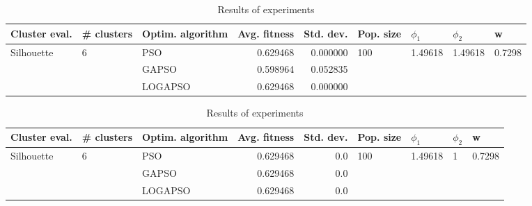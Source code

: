 \documentclass{article}
\begin{document}
\begin{table}
\centering
\caption{Results of experiments}
\begin{tabular}{lllrrllll}
\toprule
              Cluster eval. &        \# clusters & Optim. algorithm &  Avg. fitness &  Std. dev. &            Pop. size &               $\phi_{1}$ &               $\phi_{2}$ &                       w \\
\midrule
\multirow{3}{*}{Silhouette} & \multirow{3}{*}{6} &              PSO &      0.629468 &   0.000000 & \multirow{3}{*}{100} & \multirow{3}{*}{1.49618} & \multirow{3}{*}{1.49618} & \multirow{3}{*}{0.7298} \\
                            &                    &            GAPSO &      0.598964 &   0.052835 &                      &                          &                          &                         \\
                            &                    &          LOGAPSO &      0.629468 &   0.000000 &                      &                          &                          &                         \\
\bottomrule
\end{tabular}
\end{table}
\begin{table}
\centering
\caption{Results of experiments}
\begin{tabular}{lllrrllll}
\toprule
              Cluster eval. &        \# clusters & Optim. algorithm &  Avg. fitness &  Std. dev. &            Pop. size &               $\phi_{1}$ &         $\phi_{2}$ &                       w \\
\midrule
\multirow{3}{*}{Silhouette} & \multirow{3}{*}{6} &              PSO &      0.629468 &        0.0 & \multirow{3}{*}{100} & \multirow{3}{*}{1.49618} & \multirow{3}{*}{1} & \multirow{3}{*}{0.7298} \\
                            &                    &            GAPSO &      0.629468 &        0.0 &                      &                          &                    &                         \\
                            &                    &          LOGAPSO &      0.629468 &        0.0 &                      &                          &                    &                         \\
\bottomrule
\end{tabular}
\end{table}
\end{document}

